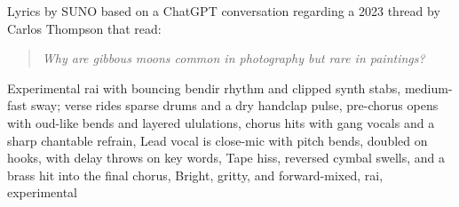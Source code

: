 
\begin{notes}
Lyrics by SUNO based on a ChatGPT conversation regarding a 2023 thread by Carlos Thompson that read:
\begin{quote}\itshape%
Why are gibbous moons common in photography but rare in paintings?
\end{quote}
\end{notes}
\begin{style}
Experimental rai with bouncing bendir rhythm and clipped synth stabs, medium-fast sway; verse rides sparse drums and a dry handclap pulse, pre-chorus opens with oud-like bends and layered ululations, chorus hits with gang vocals and a sharp chantable refrain, Lead vocal is close-mic with pitch bends, doubled on hooks, with delay throws on key words, Tape hiss, reversed cymbal swells, and a brass hit into the final chorus, Bright, gritty, and forward-mixed, rai, experimental
\end{style}
